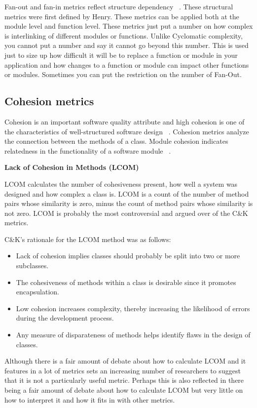 Fan-out and fan-in metrics reflect structure dependency ~\cite{fanin}.
These structural metrics were first defined by Henry.
These metrics can be applied both at the module level and function level. These metrics just put a number on how complex is interlinking of different modules or functions. Unlike Cyclomatic complexity, you cannot put a number and say it cannot go beyond this number. This is used just to size up how difficult it will be to replace a function or module in your application and how changes to a function or module can impact other functions or modules. Sometimes you can put the restriction on the number of Fan-Out.


\subsection{Cohesion metrics}
Cohesion is an important software quality attribute and high cohesion is one of the characteristics of well-structured software design ~\cite{cohesion}.
Cohesion metrics analyze the connection between the methods of a class.
Module cohesion indicates relatedness in the functionality of a software module ~\cite{cohesion2}.

\textbf{Lack of Cohesion in Methods (LCOM)}

LCOM calculates the number of cohesiveness present, how well a system was designed and how complex a class is. LCOM is a count of the number of method pairs whose similarity is zero, minus the count of method pairs whose similarity is not zero. LCOM is probably the most controversial and argued over of the C\&K metrics.

C\&K's rationale for the LCOM method was as follows:
\begin{itemize}
	\item Lack of cohesion implies classes should probably be split into two or more subclasses.
	\item The cohesiveness of methods within a class is desirable since it promotes encapsulation.
	\item Low cohesion increases complexity, thereby increasing the likelihood of errors during the development process.
	\item Any measure of disparateness of methods helps identify flaws in the design of classes. 
\end{itemize}

Although there is a fair amount of debate about how to calculate LCOM and it features in a lot of metrics sets an increasing number of researchers to suggest that it is not a particularly useful metric. Perhaps this is also reflected in there being a fair amount of debate about how to calculate LCOM but very little on how to interpret it and how it fits in with other metrics. 

